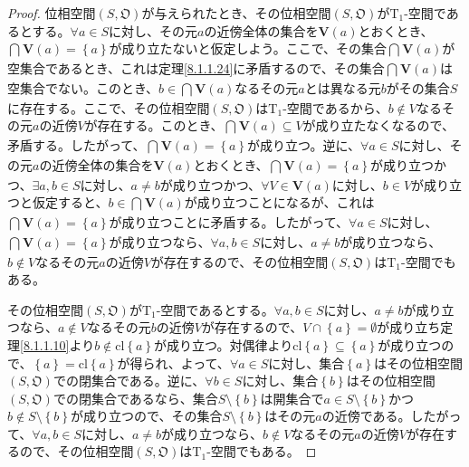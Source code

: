 \documentclass[dvipdfmx]{jsarticle}
\begin{document}
\begin{proof}
位相空間$\left( S,\mathfrak{O} \right)$が与えられたとき、その位相空間$\left( S,\mathfrak{O} \right)$が$\mathrm{T}_{1}$-空間であるとする。$\forall a \in S$に対し、その元$a$の近傍全体の集合を$\mathbf{V}(a)$とおくとき、$\bigcap_{} {\mathbf{V}(a)} = \left\{ a \right\}$が成り立たないと仮定しよう。ここで、その集合$\bigcap_{} {\mathbf{V}(a)}$が空集合であるとき、これは定理\ref{8.1.1.24}に矛盾するので、その集合$\bigcap_{} {\mathbf{V}(a)}$は空集合でない。このとき、$b \in \bigcap_{} {\mathbf{V}(a)}$なるその元$a$とは異なる元$b$がその集合$S$に存在する。ここで、その位相空間$\left( S,\mathfrak{O} \right)$は$\mathrm{T}_{1}$-空間であるから、$b \notin V$なるその元$a$の近傍$V$が存在する。このとき、$\bigcap_{} {\mathbf{V}(a)} \subseteq V$が成り立たなくなるので、矛盾する。したがって、$\bigcap_{} {\mathbf{V}(a)} = \left\{ a \right\}$が成り立つ。逆に、$\forall a \in S$に対し、その元$a$の近傍全体の集合を$\mathbf{V}(a)$とおくとき、$\bigcap_{} {\mathbf{V}(a)} = \left\{ a \right\}$が成り立つかつ、$\exists a,b \in S$に対し、$a \neq b$が成り立つかつ、$\forall V \in \mathbf{V}(a)$に対し、$b \in V$が成り立つと仮定すると、$b \in \bigcap_{} {\mathbf{V}(a)}$が成り立つことになるが、これは$\bigcap_{} {\mathbf{V}(a)} = \left\{ a \right\}$が成り立つことに矛盾する。したがって、$\forall a \in S$に対し、$\bigcap_{} {\mathbf{V}(a)} = \left\{ a \right\}$が成り立つなら、$\forall a,b \in S$に対し、$a \neq b$が成り立つなら、$b \notin V$なるその元$a$の近傍$V$が存在するので、その位相空間$\left( S,\mathfrak{O} \right)$は$\mathrm{T}_{1}$-空間でもある。\par
その位相空間$\left( S,\mathfrak{O} \right)$が$\mathrm{T}_{1}$-空間であるとする。$\forall a,b \in S$に対し、$a \neq b$が成り立つなら、$a \notin V$なるその元$b$の近傍$V$が存在するので、$V \cap \left\{ a \right\} = \emptyset$が成り立ち定理\ref{8.1.1.10}より$b \notin {\mathrm{cl}}\left\{ a \right\}$が成り立つ。対偶律より${\mathrm{cl}}\left\{ a \right\} \subseteq \left\{ a \right\}$が成り立つので、$\left\{ a \right\} = {\mathrm{cl}}\left\{ a \right\}$が得られ、よって、$\forall a \in S$に対し、集合$\left\{ a \right\}$はその位相空間$\left( S,\mathfrak{O} \right)$での閉集合である。逆に、$\forall b \in S$に対し、集合$\left\{ b \right\}$はその位相空間$\left( S,\mathfrak{O} \right)$での閉集合であるなら、集合$S \setminus \left\{ b \right\}$は開集合で$a \in S \setminus \left\{ b \right\}$かつ$b \notin S \setminus \left\{ b \right\}$が成り立つので、その集合$S \setminus \left\{ b \right\}$はその元$a$の近傍である。したがって、$\forall a,b \in S$に対し、$a \neq b$が成り立つなら、$b \notin V$なるその元$a$の近傍$V$が存在するので、その位相空間$\left( S,\mathfrak{O} \right)$は$\mathrm{T}_{1}$-空間でもある。
\end{proof}
\end{document}
